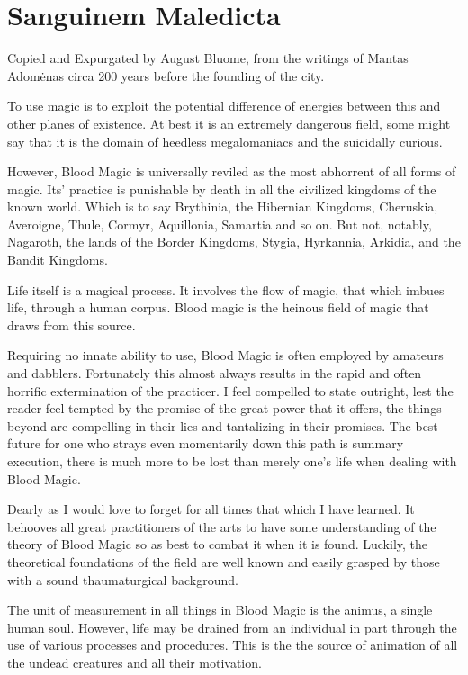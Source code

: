 \documentclass[a4paper]{article}
\begin{document}
\section*{Sanguinem Maledicta}
Copied and Expurgated by August Bluome, from the writings of Mantas Adomėnas circa 200 years before the founding of the city.

To use magic is to exploit the potential difference of energies between this and other planes of existence.  At best it is an extremely dangerous field, some might say that it is the domain of heedless megalomaniacs and the suicidally curious.

However, Blood Magic is universally reviled as the most abhorrent of all forms of magic.  Its' practice is punishable by death in all the civilized kingdoms of the known world.  Which is to say Brythinia, the Hibernian Kingdoms, Cheruskia, Averoigne, Thule, Cormyr, Aquillonia, Samartia and so on.  But not, notably, Nagaroth, the lands of the Border Kingdoms, Stygia, Hyrkannia, Arkidia, and the Bandit Kingdoms. 

Life itself is a magical process.  It involves the flow of magic, that which imbues life, through a human corpus.  Blood magic is the heinous field of magic that draws from this source.


Requiring no innate ability to use, Blood Magic is often employed by amateurs and dabblers.  Fortunately this almost always results in the rapid and often horrific extermination of the practicer.  I feel compelled to state outright, lest the reader feel tempted by the promise of the great power that it offers, the things beyond are compelling in their lies and tantalizing in their promises.  The best future for one who strays even momentarily down this path is summary execution,  there is much more to be lost than merely one's life when dealing with Blood Magic.

Dearly as I would love to forget for all times that which I have learned.  It behooves all great practitioners of the arts to have some understanding of the theory of Blood Magic so as best to combat it when it is found.  Luckily, the theoretical foundations of the field are well known and easily grasped by those with a sound thaumaturgical background.  

The unit of measurement in all things in Blood Magic is the animus, a single human soul.  However, life may be drained from an individual in part through the use of various processes and procedures.  This is the the source of animation of all the undead creatures and all their motivation.
\end{document}
